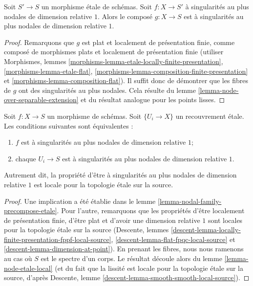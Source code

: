 \begin{lemma}
\label{lemma-nodal-family-postcompose-etale}
Soit $S' \to S$ un morphisme étale de schémas. Soit $f : X \to S'$ à singularités au plus nodales de dimension relative $1$. Alors le composé $g : X \to S$ est à singularités au plus nodales de dimension relative $1$.
\end{lemma}

\begin{proof}
Remarquons que $g$ est plat et localement de présentation finie, comme composé de morphismes plats et localement de présentation finie (utiliser Morphismes, lemmes \ref{morphisms-lemma-etale-locally-finite-presentation}, \ref{morphisms-lemma-etale-flat}, \ref{morphisms-lemma-composition-finite-presentation} et \ref{morphisms-lemma-composition-flat}). Il suffit donc de démontrer que les fibres de $g$ ont des singularités au plus nodales. Cela résulte du lemme \ref{lemma-node-over-separable-extension} et du résultat analogue pour les points lisses.
\end{proof}

\begin{lemma}
\label{lemma-nodal-family-etale-local-source}
Soit $f : X \to S$ un morphisme de schémas. Soit $\{U_i \to X\}$ un recouvrement étale. Les conditions suivantes sont équivalentes : \begin{enumerate} \item $f$ est à singularités au plus nodales de dimension relative $1$; \item chaque $U_i \to S$ est à singularités au plus nodales de dimension relative $1$. \end{enumerate} Autrement dit, la propriété d'être à singularités au plus nodales de dimension relative $1$ est locale pour la topologie étale sur la source.
\end{lemma}

\begin{proof}
Une implication a été établie dans le lemme \ref{lemma-nodal-family-precompose-etale}. Pour l'autre, remarquons que les propriétés d'être localement de présentation finie, d'être plat et d'avoir une dimension relative $1$ sont locales pour la topologie étale sur la source (Descente, lemmes \ref{descent-lemma-locally-finite-presentation-fppf-local-source}, \ref{descent-lemma-flat-fpqc-local-source} et \ref{descent-lemma-dimension-at-point}). En prenant les fibres, nous nous ramenons au cas où $S$ est le spectre d'un corps. Le résultat découle alors du lemme \ref{lemma-node-etale-local} (et du fait que la lissité est locale pour la topologie étale sur la source, d'après Descente, lemme \ref{descent-lemma-smooth-smooth-local-source}).
\end{proof}

